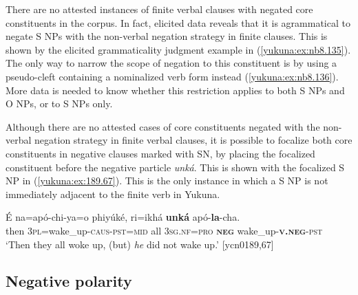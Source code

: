 \documentclass[output=paper,colorlinks,citecolor=brown]{langscibook}
\begin{document}
There are no attested instances of finite verbal clauses with negated core constituents in the corpus. In fact, elicited data reveals that it is agrammatical to negate S NPs with the non-verbal negation strategy in finite clauses. This is shown by the elicited grammaticality judgment example in (\ref{yukuna:ex:nb8.135}). The only way to narrow the scope of negation to this constituent is by using a pseudo-cleft containing a nominalized verb form instead (\ref{yukuna:ex:nb8.136}). More data is needed to know whether this restriction applies to both S NPs and O NPs, or to S NPs only. 

\z

\z

Although there are no attested cases of core constituents negated with the non-verbal negation strategy in finite verbal clauses, it is possible to focalize both core constituents in negative clauses marked with SN, by placing the focalized constituent before the negative particle \textit{unká}. This is shown with the focalized S NP in (\ref{yukuna:ex:189.67}). This is the only instance in which a S NP is not immediately adjacent to the finite verb in Yukuna.

\ea\label{yukuna:ex:189.67}
\gll  É na=apó-chi-ya=o phiyúké, ri=ikhá \textbf{unká} apó-\textbf{la}-cha. \\
then \textsc{3pl}=wake\_up-\textsc{caus}-\textsc{pst}=\textsc{mid} all \textsc{3sg.nf}=\textsc{pro} \textbf{\textsc{neg}} wake\_up-\textbf{\textsc{v.neg}}-\textsc{pst}\\
\glt ‘Then they all woke up, (but) \textit{he} did not wake up.’ [ycn0189,67]
\z

\subsection{Negative polarity}\label{yukuna:negpol}
\end{document}
